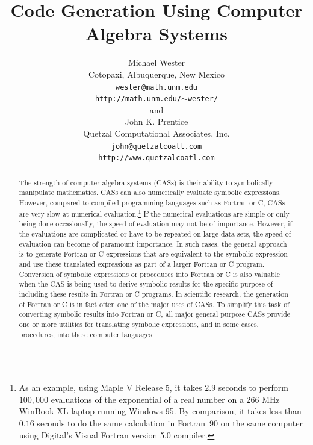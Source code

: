 \documentclass[11pt]{article}
\begin{document}
\title{Code Generation Using Computer Algebra Systems}
\author{Michael Wester \\ Cotopaxi, Albuquerque, New Mexico \\
{\tt wester@math.unm.edu} \\ {\tt http://math.unm.edu/$\sim$wester/} \\ and \\
John K. Prentice \\ Quetzal Computational Associates, Inc. \\
{\tt john@quetzalcoatl.com} \\ {\tt http://www.quetzalcoatl.com}}
\date{}
\maketitle
\begin{abstract}
The strength of computer algebra systems (CASs) is their ability to 
symbolically manipulate mathematics.  CASs can also 
numerically evaluate symbolic expressions.  However, compared to 
compiled programming languages such as Fortran or C,
CASs are very slow at numerical evaluation.\footnote{As an example, 
using Maple V Release 5, it takes $2.9$ seconds to perform $100,000$ 
evaluations of the exponential of a real number on a 266 MHz WinBook XL 
laptop running Windows 95.  By comparison, it takes less than $0.16$ 
seconds to do the same calculation in Fortran~90 on the same computer 
using Digital's Visual Fortran version 5.0 compiler.}  If the 
numerical evaluations are simple or only being done occasionally, the 
speed of evaluation may not be of importance.  However, if the 
evaluations are complicated or have to be repeated on large data sets, 
the speed of evaluation can become of paramount importance.  In such 
cases, the general approach is to generate Fortran or C expressions 
that are equivalent to the symbolic expression
and use these translated expressions as part of a larger Fortran or C 
program.  Conversion of symbolic expressions or procedures into Fortran 
or C is also valuable when the CAS is being used to 
derive symbolic results for the specific purpose of including these 
results in Fortran or C programs.  In scientific research, the 
generation of Fortran or C is in fact often one of the major uses of CASs.
To simplify this task of converting symbolic 
results into Fortran or C, all major general purpose
CASs provide one or more utilities for translating symbolic 
expressions, and in some cases, procedures, into these computer 
languages.  


\end{abstract}
\end{document}

